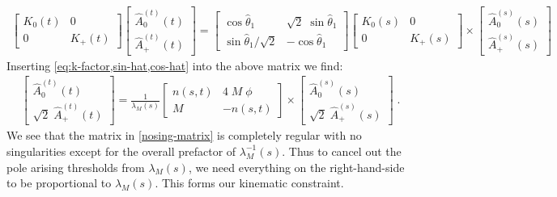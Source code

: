  \begin{align}
    \begin{bmatrix}
        K_{0}(t)   & 0 \\
        0  &  K_{+}(t)
    \end{bmatrix}
    \begin{bmatrix}
      \hat{A}^{(t)}_{0}(t) \\
      \hat{A}^{(t)}_{+}(t)
    \end{bmatrix}
    =
    \begin{bmatrix}
      \cos \hat{\theta}_1  &  \sqrt{2} \; \sin \hat{\theta}_1   \\
       \sin \hat{\theta}_1 / \sqrt{2}  &  - \cos \hat{\theta}_1
    \end{bmatrix}
    \begin{bmatrix}
        K_{0}(s)   & 0 \\
        0  &  K_{+}(s)
    \end{bmatrix}
    \times
    \begin{bmatrix}
  \hat{A}^{(s)}_{0}(s) \\
  \hat{A}^{(s)}_{+}(s)
    \end{bmatrix}
  \end{align}
Inserting \cref{eq:k-factor,sin-hat,cos-hat} into the above matrix we find:
  \begin{align} \label{nosing-matrix}
    \begin{bmatrix}
  \hat{A}^{(t)}_{0}(t) \\
  \sqrt{2} \; \hat{A}^{(t)}_{+}(t)
    \end{bmatrix}
    =
    \frac{1}{\lambda_M(s)}
    \begin{bmatrix}
        n(s,t)   &  4 \; M \; \phi \\
        M  & - n(s,t)
    \end{bmatrix}
    \times
    \begin{bmatrix}
  \hat{A}^{(s)}_{0}(s) \\
  \sqrt{2} \;  \hat{A}^{(s)}_{+}(s)
    \end{bmatrix} \; .
  \end{align}
We see that the matrix in \cref{nosing-matrix} is completely regular with no singularities except for the overall prefactor of \(\lambda_M^{-1}(s)\). Thus to cancel out the pole arising thresholds from \(\lambda_M(s)\), we need everything on the right-hand-side to be proportional to \(\lambda_M(s)\). This forms our kinematic constraint.

